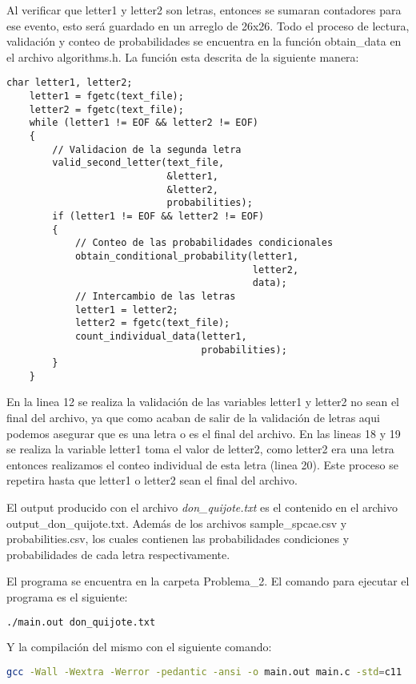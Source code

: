 Al verificar que letter1 y letter2 son letras, entonces se sumaran contadores para ese evento, esto será guardado en un arreglo de 26x26. Todo el proceso de lectura, validación y conteo de probabilidades se encuentra en la función \textcolor{title}{obtain\_data} en el archivo \textcolor{citecolor}{algorithms.h}. La función esta descrita de la siguiente manera:

\begin{lstlisting}[style=CStyle]
    char letter1, letter2;
    letter1 = fgetc(text_file);
    letter2 = fgetc(text_file);
    while (letter1 != EOF && letter2 != EOF)
    {
        // Validacion de la segunda letra
        valid_second_letter(text_file,
                            &letter1,
                            &letter2,
                            probabilities);
        if (letter1 != EOF && letter2 != EOF)
        {
            // Conteo de las probabilidades condicionales
            obtain_conditional_probability(letter1,
                                           letter2,
                                           data);
            // Intercambio de las letras
            letter1 = letter2;
            letter2 = fgetc(text_file);
            count_individual_data(letter1,
                                  probabilities);
        }
    }
\end{lstlisting}

En la linea 12 se realiza la validación de las variables letter1 y letter2 no sean el final del archivo, ya que como acaban de salir de la validación de letras aqui podemos asegurar que es una letra o es el final del archivo. En las lineas 18 y 19 se realiza la variable letter1 toma el valor de letter2, como letter2 era una letra entonces realizamos el conteo individual de esta letra (linea 20). Este proceso se repetira hasta que letter1 o letter2 sean el final del archivo.

El output producido con el archivo \textit{don\_quijote.txt} es el contenido en el archivo \textcolor{citecolor}{output\_don\_qui\-jote.txt}. Además de los archivos \textcolor{citecolor}{sample\_spcae.csv} y \textcolor{citecolor}{probabilities.csv}, los cuales contienen las probabilidades condiciones y probabilidades de cada letra respectivamente.

El programa se encuentra en la carpeta \textcolor{citecolor}{Problema\_2}. El comando para ejecutar el programa es el siguiente:

\begin{lstlisting}[language=bash]
    ./main.out don_quijote.txt
\end{lstlisting}

Y la compilación del mismo con el siguiente comando:

\begin{lstlisting}[language=bash]
    gcc -Wall -Wextra -Werror -pedantic -ansi -o main.out main.c -std=c11
\end{lstlisting}